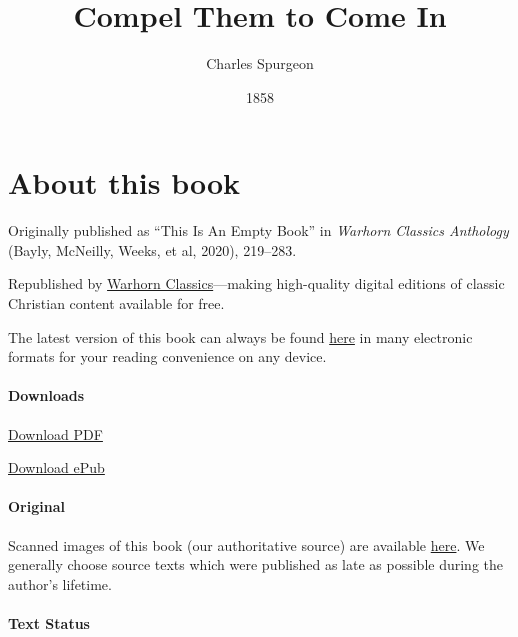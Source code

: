 \documentclass[
]{book}
\title{Compel Them to Come In}
\author{Charles Spurgeon}
\date{1858}
\begin{document}
\maketitle

\mainmatter
{}

{
\setcounter{tocdepth}{1}
\tableofcontents
}
\hypertarget{about-this-book}{%
\chapter*{About this book}\label{about-this-book}}

Originally published as ``This Is An Empty Book'' in \emph{Warhorn Classics Anthology} (Bayly, McNeilly, Weeks, et al, 2020), 219--283.

Republished by \href{https://classics.warhornmedia.com/}{Warhorn Classics}---making high-quality digital editions of classic Christian content available for free.

The latest version of this book can always be found \href{https://warhornmedia.github.io/spurgeon-compel-them-to-come-in/}{here} in many electronic formats for your reading convenience on any device.

\hypertarget{downloads}{%
\subsubsection*{Downloads}\label{downloads}}

\href{https://warhornmedia.github.io/spurgeon-compel-them-to-come-in//Spurgeon-Compel_Them_to_Come_In.pdf}{Download PDF}

\href{https://warhornmedia.github.io/spurgeon-compel-them-to-come-in//Spurgeon-Compel_Them_to_Come_In.epub}{Download ePub}

\hypertarget{original}{%
\subsubsection*{Original}\label{original}}

Scanned images of this book (our authoritative source) are available \href{https://www.spurgeongems.org/sermon/chs227.pdf}{here}. We generally choose source texts which were published as late as possible during the author's lifetime.

\hypertarget{text-status}{%
\subsubsection*{Text Status}\label{text-status}}
\end{document}
